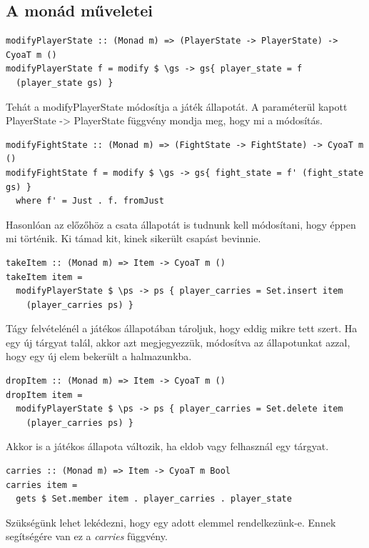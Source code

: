 \documentclass[12pt,a4paper,oneside]{report}
\begin{document}
    \subsection{A monád műveletei}
    \begin{verbatim}
modifyPlayerState :: (Monad m) => (PlayerState -> PlayerState) ->
CyoaT m ()
modifyPlayerState f = modify $ \gs -> gs{ player_state = f
  (player_state gs) }
    \end{verbatim}
    Tehát a modifyPlayerState módosítja a játék állapotát. A
    paraméterül kapott PlayerState -> PlayerState függvény mondja meg,
    hogy mi a módosítás.
    \begin{verbatim}
modifyFightState :: (Monad m) => (FightState -> FightState) -> CyoaT m ()
modifyFightState f = modify $ \gs -> gs{ fight_state = f' (fight_state gs) }
  where f' = Just . f. fromJust
      \end{verbatim}
    Hasonlóan az előzőhöz a csata állapotát is tudnunk kell
    módosítani, hogy éppen mi történik. Ki támad kit, kinek sikerült
    csapást bevinnie.

    \begin{verbatim}
takeItem :: (Monad m) => Item -> CyoaT m ()
takeItem item =
  modifyPlayerState $ \ps -> ps { player_carries = Set.insert item
    (player_carries ps) }
    \end{verbatim}
    Tágy felvételénél a játékos állapotában tároljuk, hogy eddig mikre
    tett szert. Ha egy új tárgyat talál, akkor azt
    megjegyezzük, módosítva az állapotunkat azzal, hogy egy új elem
    bekerült a halmazunkba.

    \begin{verbatim}
dropItem :: (Monad m) => Item -> CyoaT m ()
dropItem item =
  modifyPlayerState $ \ps -> ps { player_carries = Set.delete item
    (player_carries ps) }
    \end{verbatim}
    Akkor is a játékos állapota változik, ha eldob vagy felhasznál egy tárgyat.

    \begin{verbatim}
carries :: (Monad m) => Item -> CyoaT m Bool
carries item =
  gets $ Set.member item . player_carries . player_state
    \end{verbatim}
    Szükségünk lehet lekédezni, hogy egy adott elemmel
    rendelkezünk-e. Ennek segítségére van ez a \emph{carries} függvény.
\end{document}
